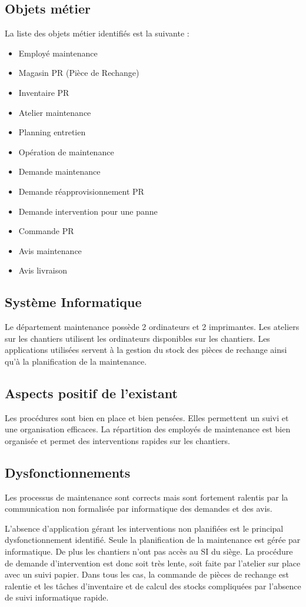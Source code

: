 \documentclass[12pt]{article}
\begin{document}
\subsection{Objets métier}
La liste des objets métier identifiés est la suivante :
\begin{itemize}
\item Employé maintenance
\item Magasin PR (Pièce de Rechange)
\item Inventaire PR
\item Atelier maintenance
\item Planning entretien
\item Opération de maintenance
\item Demande maintenance
\item Demande réapprovisionnement PR
\item Demande intervention pour une panne
\item Commande PR
\item Avis maintenance
\item Avis livraison
\end{itemize}

\subsection{Système Informatique}
Le département maintenance possède 2 ordinateurs et 2 imprimantes.
Les ateliers sur les chantiers utilisent les ordinateurs disponibles sur les
chantiers.
Les applications utilisées servent à la gestion du stock des pièces de rechange
ainsi qu'à la planification de la maintenance.

\subsection{Aspects positif de l'existant}

Les procédures sont bien en place et bien pensées. Elles permettent un suivi
et une organisation efficaces.
La répartition des employés de maintenance est bien organisée et permet
des interventions rapides sur les chantiers.

\subsection{Dysfonctionnements}
Les processus de maintenance sont corrects mais sont fortement ralentis par
la communication non formalisée par informatique des demandes et des avis.

L'absence d'application gérant les interventions non planifiées est le principal
dysfonctionnement identifié. Seule la planification de la maintenance est gérée
par informatique. De plus les chantiers n'ont pas accès au SI du siège. La 
procédure de demande d'intervention est donc soit très lente, soit faite par
l'atelier sur place avec un suivi papier. Dans tous les cas, la commande de 
pièces de rechange est ralentie et les tâches d'inventaire et de calcul des
stocks compliquées par l'absence de suivi informatique rapide.
\end{document}
